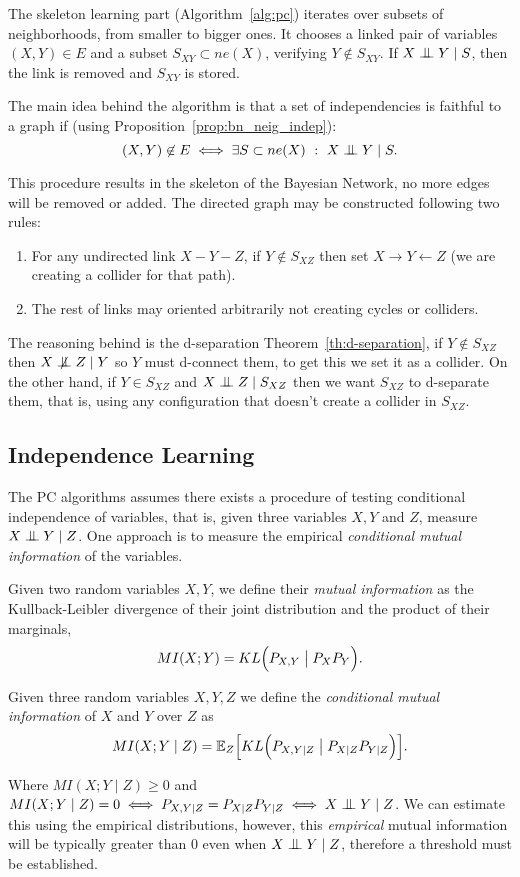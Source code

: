 The skeleton learning part (Algorithm~\ref{alg:pc}) iterates over subsets of neighborhoods, from smaller to bigger ones. It chooses a linked pair of variables \((X,Y) \in E\) and
a subset \(S_{XY} \subset ne(X)\), verifying \(Y \notin S_{XY}\). If \(X \bigCI Y \mid S\), then the link is removed and \(S_{XY}\) is stored.

The main idea behind the algorithm is that a set of independencies is faithful to a graph if (using Proposition~\ref{prop:bn_neig_indep}):
\[
  (X,Y) \not \in E \iff \exists S \subset ne(X) \ : \ X \bigCI Y \mid S.
\]

This procedure results in the skeleton of the Bayesian Network, no more edges will be removed or added. The directed graph may be constructed following two rules:
\begin{enumerate}
  \item For any undirected link \(X - Y - Z\), if \(Y \notin S_{XZ}\) then set
    \(X \to Y \leftarrow Z\) (we are creating a collider for that path).
  \item The rest of links may oriented arbitrarily not
creating cycles or colliders.
\end{enumerate}
The reasoning behind is the d-separation Theorem~\ref{th:d-separation},  if \(Y \notin S_{XZ}\) then \(X \bigCD Z \mid Y\) so \(Y\) must d-connect them, to get this we set it as a collider. On the other hand, if \(Y \in S_{XZ}\) and
\(X \bigCI Z \mid S_{XZ}\) then we want \(S_{XZ}\) to d-separate them, that is,
using any configuration that doesn't create a collider in \(S_{XZ}\).

\subsection{Independence Learning}

The PC algorithms assumes there exists a procedure of testing conditional independence of variables, that is, given three variables \(X, Y\) and \( Z \),  measure \(X \bigCI Y \mid Z\). One approach is to measure the empirical \emph{conditional mutual information} of the variables.

\begin{definition}
  Given two random variables \(X, Y\), we define their \emph{mutual information} as the Kullback-Leibler divergence of their joint distribution and the product of their marginals,
  \[
    MI(X;Y) = KL\Big(P_{X,Y} \bigm| P_{X}P_{Y}\Big).
  \]
\end{definition}

\begin{definition}
  Given three random variables \(X, Y, Z\) we define the \emph{conditional mutual information} of \(X\) and \(Y\) over \(Z\) as
  \[
    MI(X;Y\mid Z) = \mathbb{E}_{Z}\Big[KL\Big(P_{X,Y \mid Z} \bigm| P_{X\mid Z} P_{Y \mid Z}\Big)\Big].
  \]
\end{definition}
Where \(MI(X;Y \mid Z) \geq 0\) and \(MI(X;Y \mid Z) = 0 \iff P_{X,Y \mid Z} = P_{X\mid Z} P_{Y \mid Z} \iff X\bigCI Y \mid Z\). We can estimate this using the empirical distributions, however, this \emph{empirical} mutual information will be typically greater than \(0\) even when \(X\bigCI Y \mid Z\), therefore a threshold must be established.

